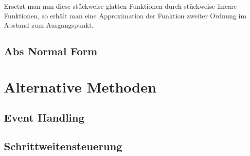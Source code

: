 Ersetzt man nun diese stückweise glatten Funktionen durch stückweise lineare Funktionen, so erhält man eine Approximation der Funktion zweiter Ordnung im Abstand zum Ausgangspunkt.


\subsection{Abs Normal Form}


\section{Alternative Methoden}
\subsection{Event Handling}
\subsection{Schrittweitensteuerung}
